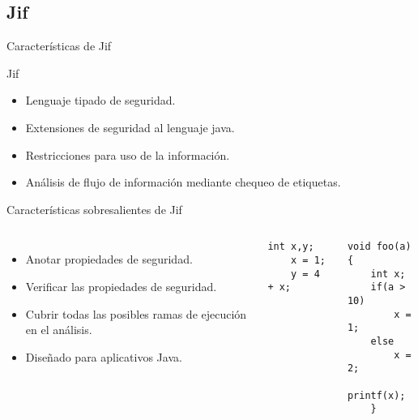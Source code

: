 \subsection{Jif}
\begin{frame}{Características de Jif}
\begin{block}{Jif}
\begin{itemize}
  \item Lenguaje tipado de seguridad.
  \item Extensiones de seguridad al lenguaje java.
  \item Restricciones para uso de la información.
  \item Análisis de flujo de información mediante chequeo de etiquetas.
\end{itemize}
\end{block}
\end{frame}
\begin{frame}[fragile]{Características sobresalientes de Jif}
\begin{columns}[T]
\column{2in}
	\begin{itemize}
	  \item Anotar propiedades de seguridad.
	  \item Verificar las propiedades de seguridad.
	  \item Cubrir todas las posibles ramas de ejecución en el análisis.
	  \item Diseñado para aplicativos Java.
	\end{itemize}
\begin{lstlisting}[style=base]
	int x,y;
	x = 1;	
	y = 4 + x;
\end{lstlisting}
\vspace{-0.5em}
\begin{lstlisting}[style=base]
	void foo(a){
	int x;
	if(a > 10)
		x = 1;
	else
		x = 2;
	printf(x); 
	}
\end{lstlisting}
\end{columns}

\end{frame}

